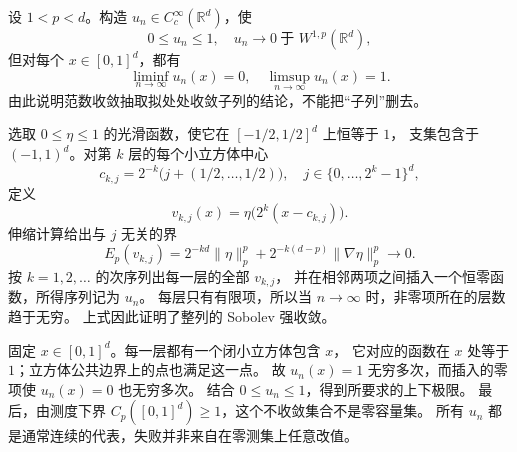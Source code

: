 \begin{exercise}\label{b1:ex:26-strong-convergence-without-full-pointwise-limit}
设 \(1<p<d\)。构造 \(u_n\in C_c^\infty(\mathbb R^d)\)，使
\[
 0\le u_n\le1,\quad u_n\longrightarrow0\ \text{于 }W^{1,p}(\mathbb R^d),
\]
但对每个 \(x\in[0,1]^d\)，都有
\[
 \liminf_{n\to\infty}u_n(x)=0,\quad
 \limsup_{n\to\infty}u_n(x)=1.
\]
由此说明范数收敛抽取拟处处收敛子列的结论，不能把“子列”删去。
\end{exercise}
\begin{solution}
选取 \(0\le\eta\le1\) 的光滑函数，使它在 \([-1/2,1/2]^d\) 上恒等于 \(1\)，
支集包含于 \((-1,1)^d\)。对第 \(k\) 层的每个小立方体中心
\[
 c_{k,j}=2^{-k}\bigl(j+(1/2,\ldots,1/2)\bigr),
 \quad j\in\{0,\ldots,2^k-1\}^d,
\]
定义
\[
 v_{k,j}(x)=\eta\bigl(2^k(x-c_{k,j})\bigr).
\]
伸缩计算给出与 \(j\) 无关的界
\[
 E_p(v_{k,j})=
 2^{-kd}\|\eta\|_p^p+
 2^{-k(d-p)}\|\nabla\eta\|_p^p\longrightarrow0.
\]
按 \(k=1,2,\ldots\) 的次序列出每一层的全部 \(v_{k,j}\)，
并在相邻两项之间插入一个恒零函数，所得序列记为 \(u_n\)。
每层只有有限项，所以当 \(n\to\infty\) 时，非零项所在的层数趋于无穷。
上式因此证明了整列的 Sobolev 强收敛。

固定 \(x\in[0,1]^d\)。每一层都有一个闭小立方体包含 \(x\)，
它对应的函数在 \(x\) 处等于 \(1\)；立方体公共边界上的点也满足这一点。
故 \(u_n(x)=1\) 无穷多次，而插入的零项使 \(u_n(x)=0\) 也无穷多次。
结合 \(0\le u_n\le1\)，得到所要求的上下极限。
最后，由测度下界 \(C_p([0,1]^d)\ge1\)，这个不收敛集合不是零容量集。
所有 \(u_n\) 都是通常连续的代表，失败并非来自在零测集上任意改值。
\end{solution}

